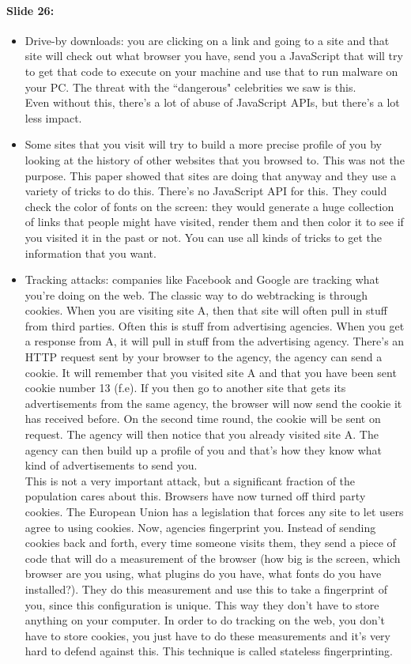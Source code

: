 \documentclass[10pt,a4paper]{report}
\begin{document}
\paragraph{Slide 26:}
\begin{itemize}
\item Drive-by downloads: you are clicking on a link and going to a site and that site will check out what browser you have, send you a JavaScript that will try to get that code to execute on your machine and use that to run malware on your PC. The threat with the ``dangerous" celebrities we saw is this.\\
Even without this, there's a lot of abuse of JavaScript APIs, but there's a lot less impact.
\item Some sites that you visit will try to build a more precise profile of you by looking at the history of other websites that you browsed to. This was not the purpose. This paper showed that sites are doing that anyway and they use a variety of tricks to do this. There's no JavaScript API for this. They could check the color of fonts on the screen: they would generate a huge collection of links that people might have visited, render them and then color it to see if you visited it in the past or not. You can use all kinds of tricks to get the information that you want.
\item Tracking attacks: companies like Facebook and Google are tracking what you're doing on the web. The classic way to do webtracking is through cookies. When you are visiting site A, then that site will often pull in stuff from third parties. Often this is stuff from advertising agencies. When you get a response from A, it will pull in stuff from the advertising agency. There's an HTTP request sent by your browser to the agency, the agency can send a cookie. It will remember that you visited site A and that you have been sent cookie number 13 (f.e). If you then go to another site that gets its advertisements from the same agency, the browser will now send the cookie it has received before. On the second time round, the cookie will be sent on request. The agency will then notice that you already visited site A. The agency can then build up a profile of you and that's how they know what kind of advertisements to send you. \\
This is not a very important attack, but a significant fraction of the population cares about this. Browsers have now turned off third party cookies. The European Union has a legislation that forces any site to let users agree to using cookies. Now, agencies fingerprint you. Instead of sending cookies back and forth, every time someone visits them, they send a piece of code that will do a measurement of the browser (how big is the screen, which browser are you using, what plugins do you have, what fonts do you have installed?). They do this measurement and use this to take a fingerprint of you, since this configuration is unique. This way they don't have to store anything on your computer. In order to do tracking on the web, you don't have to store cookies, you just have to do these measurements and it's very hard to defend against this. This technique is called stateless fingerprinting.
\end{itemize}
\end{document}
